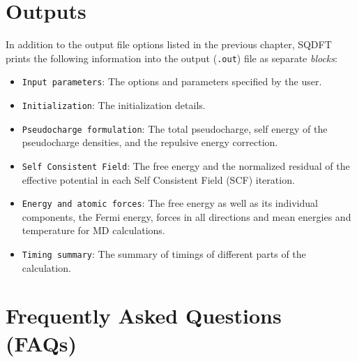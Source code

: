 \documentclass[12pt]{report}
\begin{document}
\chapter{Outputs}
In addition to the output file options listed in the previous chapter, SQDFT prints the following information into the output (\texttt{.out}) file as separate \emph{blocks}:
\begin{itemize}
\item \texttt{Input parameters}: The options and parameters specified by the user. 
\item \texttt{Initialization}: The initialization details. 
\item \texttt{Pseudocharge formulation}: The total pseudocharge, self energy of the pseudocharge densities, and the repulsive energy correction. 
\item \texttt{Self Consistent Field}: The free energy and the normalized residual of the effective potential in each Self Consistent Field (SCF) iteration.
\item \texttt{Energy and atomic forces}: The free energy as well as its individual components, the Fermi energy, forces in all directions and mean energies and temperature for MD calculations.
\item \texttt{Timing summary}: The summary of timings of different parts of the calculation.
\end{itemize} 


\chapter{Frequently Asked Questions (FAQs)}
\end{document}
